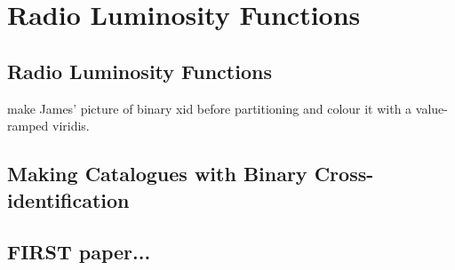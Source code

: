\chapter{Radio Luminosity Functions}
\label{cha:rlfs}

\section{Radio Luminosity Functions}
\label{sec:rlfs}

make James' picture of binary xid before partitioning and colour it with a value-ramped viridis.

\section{Making Catalogues with Binary Cross-identification}
\label{sec:revisiting-cross-id}


\section{FIRST paper...}
